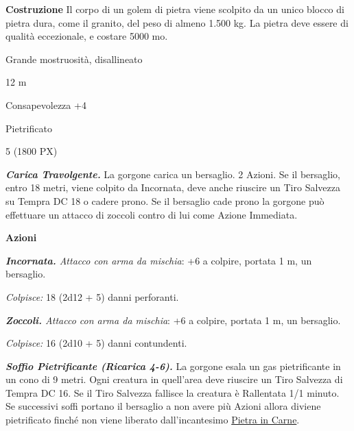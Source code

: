 \begin{multicols}{2}
{\textbf{Costruzione}
Il corpo di un golem di pietra viene scolpito da un unico blocco di pietra dura, come il granito, del peso di almeno 1.500 kg. La pietra deve essere di qualità eccezionale, e costare 5000 mo.

\begin{description}[noitemsep, topsep=0pt, parsep=0pt, partopsep=0pt, itemsep=1pt, leftmargin=2.35cm,  labelwidth=2.2cm, itemindent=0cm, listparindent=0pt] %
\setlength{\baselineskip}{10pt}
\item[\textbf{Taglia/Tipo}] Grande mostruosità, disallineato
\item[\textbf{Caratt.}] 
\item[\textbf{Punti Ferita}] 
\item[\textbf{Movimento}] 12 m
\item[\textbf{Tiri Salvez.}] 
\item[\textbf{Comp.}] Consapevolezza +4
\item[\textbf{Immunità}] Pietrificato
\item[\textbf{Sensi}] 
\item[\textbf{Sfida}] 5 (1800 PX)
\end{description}
\smallskip

\emph{\textbf{Carica Travolgente.}} La gorgone carica un bersaglio. 2 Azioni. Se il bersaglio, entro 18 metri, viene colpito da Incornata, deve anche riuscire un Tiro Salvezza su Tempra DC 18 o cadere prono. Se il bersaglio cade prono la gorgone può effettuare un attacco di zoccoli contro di lui come Azione Immediata.

\textbf{Azioni}

\emph{\textbf{Incornata.} Attacco con arma da mischia}: +6 a colpire, portata 1 m, un bersaglio.

\emph{Colpisce:} 18 (2d12 + 5) danni perforanti.

\emph{\textbf{Zoccoli.} Attacco con arma da mischia}: +6 a colpire, portata 1 m, un bersaglio.

\emph{Colpisce:} 16 (2d10 + 5) danni contundenti.

\emph{\textbf{Soffio Pietrificante (Ricarica 4-6).}} La gorgone esala un gas pietrificante in un cono di 9 metri. Ogni creatura in quell'area deve riuscire un Tiro Salvezza di Tempra DC 16. Se il Tiro Salvezza fallisce la creatura è Rallentata 1/1 minuto. Se successivi soffi portano il bersaglio a non avere più Azioni allora diviene pietrificato finché non viene liberato dall'incantesimo \hyperlink{Pietra in Carne}{Pietra in Carne}.

}
\end{multicols}
